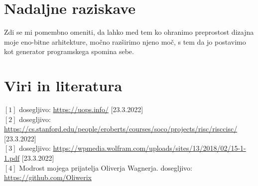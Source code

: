 \documentclass[12pt]{article}
\begin{document}
\section{Nadaljne raziskave}
Zdi se mi pomembno omeniti, da lahko med tem ko ohranimo preprostost dizajna moje eno-bitne arhitekture, močno razširimo njeno moč, s tem da jo postavimo kot generator programskega spomina sebe.

\pagebreak
\section{Viri in literatura}
$[1]$ dosegljivo: \url{https://uops.info/} [23.3.2022]\\
$[2]$ dosegljivo: \url{https://cs.stanford.edu/people/eroberts/courses/soco/projects/risc/risccisc/} [23.3.2022]\\
$[3]$ dosegljivo: \url{https://wpmedia.wolfram.com/uploads/sites/13/2018/02/15-1-1.pdf} [23.3.2022]\\
$[4]$ Modrost mojega prijatelja Oliverja Wagnerja. dosegljivo: \url{https://github.com/Oliwerix}\\

\end{document}
